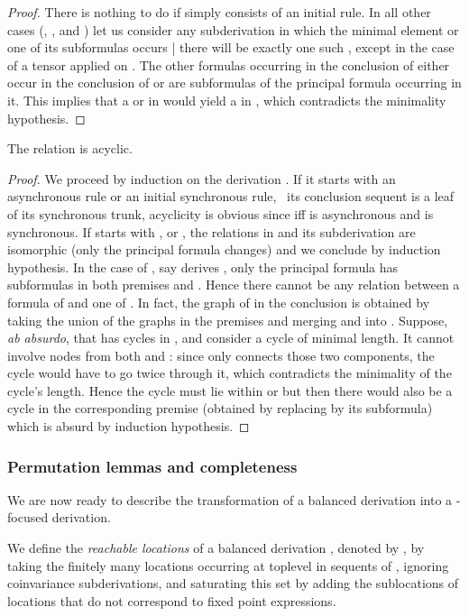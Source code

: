 \begin{proof}
There is nothing to do
if  simply consists of an initial rule.
In all other cases
(, ,  and )
let us consider any subderivation  in which
the minimal element  or one of its subformulas  occurs
| there will be exactly one such , except in the case of a tensor
applied on .
The other formulas occurring in the conclusion of 
either occur in the conclusion of  or are subformulas
of the principal formula occurring in it.
This implies that a  or  in 
would yield a  in ,
which contradicts the minimality hypothesis.
\end{proof}

\begin{lemma}\label{lem:mini}
The relation  is acyclic.
\end{lemma}

\begin{proof}
We proceed by induction on the derivation .
If it starts with an asynchronous rule or an initial synchronous rule,
\ie\ its conclusion sequent is a leaf of its synchronous trunk,
acyclicity is obvious since  iff  is asynchronous
and  is synchronous.
If  starts with ,  or ,
the relations  in  and its subderivation
are isomorphic (only the principal formula changes)
and we conclude by induction hypothesis.
In the case of ,
say  derives ,
only the principal formula  has subformulas in both premises
 and .
Hence there cannot be any  relation between a formula of 
and one of .
In fact, the graph of  in the conclusion is obtained by taking
the union of the graphs in the premises
and merging  and  into .
Suppose, \emph{ab absurdo}, that  has cycles in ,
and consider a cycle of minimal length.
It cannot involve nodes from both  and :
since only  connects those two components,
the cycle would have to go twice through it,
which contradicts the minimality of the cycle's length.
Hence the cycle must lie within
 or 
but then there would also be a cycle in the corresponding premise
(obtained by replacing  by its subformula)
which is absurd by induction hypothesis.
\end{proof}

\subsubsection{Permutation lemmas and completeness} 

We are now ready to describe the transformation of a balanced derivation
into a -focused derivation.

\begin{definition}
We define the \emph{reachable locations} of a balanced
derivation , denoted by , by taking
the finitely many locations occurring at toplevel in sequents of ,
ignoring coinvariance subderivations,
and saturating this set by adding the sublocations of
locations that do not correspond to fixed point expressions.
\end{definition}

